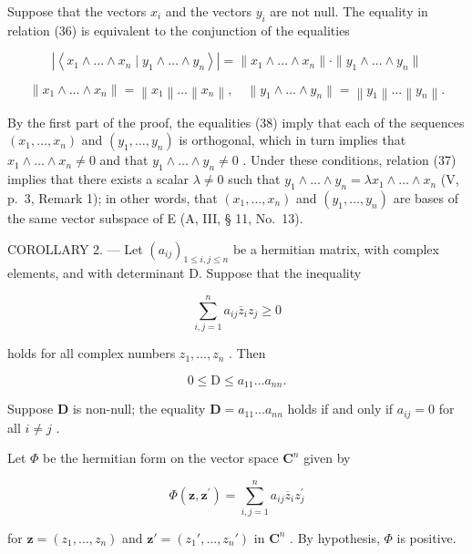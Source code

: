 Suppose that the vectors \(x_{i}\) and the vectors \(y_{i}\) are not null. The equality in relation (36) is equivalent to the conjunction of the equalities

\[
\left| \left\langle x _ {1} \wedge \dots \wedge x _ {n} \mid y _ {1} \wedge \dots \wedge y _ {n} \right\rangle \right| = \| x _ {1} \wedge \dots \wedge x _ {n} \| \cdot \| y _ {1} \wedge \dots \wedge y _ {n} \|\tag{37}
\]

\[
\left\| x _ {1} \wedge \dots \wedge x _ {n} \right\| = \left\| x _ {1} \right\| \dots \left\| x _ {n} \right\|, \quad \left\| y _ {1} \wedge \dots \wedge y _ {n} \right\| = \left\| y _ {1} \right\| \dots \left\| y _ {n} \right\|.\tag{38}
\]

By the first part of the proof, the equalities (38) imply that each of the sequences \((x_{1},\ldots ,x_{n})\) and \((y_{1},\ldots ,y_{n})\) is orthogonal, which in turn implies that \(x_{1}\wedge \ldots \wedge x_{n}\neq 0\) and that \(y_{1}\wedge \ldots \wedge y_{n}\neq 0\) . Under these conditions, relation (37) implies that there exists a scalar \(\lambda \neq 0\) such that \(y_{1}\wedge \ldots \wedge y_{n} = \lambda x_{1}\wedge \ldots \wedge x_{n}\) (V, p.~3, Remark 1); in other words, that \((x_{1},\dots,x_{n})\) and \((y_{1},\dots,y_{n})\) are bases of the same vector subspace of E (A, III, § 11, No.~13).

COROLLARY 2. --- Let \((a_{ij})_{1\leqslant i,j\leqslant n}\) be a hermitian matrix, with complex elements, and with determinant D. Suppose that the inequality

\[
\sum_ {i, j = 1} ^ {n} a _ {i j} \overline {{z}} _ {i} z _ {j} \geqslant 0\tag{39}
\]

holds for all complex numbers \(z_{1}, \ldots, z_{n}\) . Then

\[
0 \leqslant \mathrm{D} \leqslant a _ {1 1} \dots a _ {n n}.\tag{40}
\]

Suppose \(\mathbf{D}\) is non-null; the equality \(\mathbf{D} = a_{11} \ldots a_{nn}\) holds if and only if \(a_{ij} = 0\) for all \(i \neq j\) .

Let \(\Phi\) be the hermitian form on the vector space \(\mathbf{C}^n\) given by

\[
\Phi (\mathbf {z}, \mathbf {z} ^ {\prime}) = \sum_ {i, j = 1} ^ {n} a _ {i j} \overline {{{{z}}}} _ {i} z _ {j} ^ {\prime}
\]

for \(\mathbf{z} = (z_1, \dots, z_n)\) and \(\mathbf{z}' = (z_1', \dots, z_n')\) in \(\mathbf{C}^n\) . By hypothesis, \(\Phi\) is positive.

